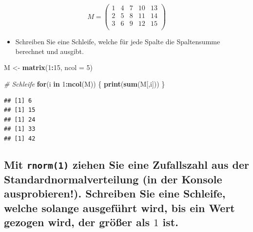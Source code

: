 \documentclass[12pt,a4paper]{article}
\newenvironment{Shaded}{\begin{snugshade}}{\end{snugshade}}
\newcommand{\AttributeTok}[1]{\textcolor[rgb]{0.13,0.29,0.53}{#1}}
\newcommand{\CommentTok}[1]{\textcolor[rgb]{0.56,0.35,0.01}{\textit{#1}}}
\newcommand{\ControlFlowTok}[1]{\textcolor[rgb]{0.13,0.29,0.53}{\textbf{#1}}}
\newcommand{\DecValTok}[1]{\textcolor[rgb]{0.00,0.00,0.81}{#1}}
\newcommand{\FunctionTok}[1]{\textcolor[rgb]{0.13,0.29,0.53}{\textbf{#1}}}
\newcommand{\NormalTok}[1]{#1}
\newcommand{\OtherTok}[1]{\textcolor[rgb]{0.56,0.35,0.01}{#1}}
\newcommand{\SpecialCharTok}[1]{\textcolor[rgb]{0.81,0.36,0.00}{\textbf{#1}}}
\begin{document}
\[
M=\begin{pmatrix}
1 & 4 & 7 & 10 & 13\\
2 & 5 & 8 & 11 & 14\\
3 & 6 & 9 & 12 & 15\\
\end{pmatrix}
\]

\begin{itemize}
  \item Schreiben Sie eine Schleife, welche für jede Spalte die Spaltensumme berechnet und ausgibt.
\end{itemize}

\begin{Shaded}
\begin{Highlighting}[]
\NormalTok{    M }\OtherTok{\textless{}{-}} \FunctionTok{matrix}\NormalTok{(}\DecValTok{1}\SpecialCharTok{:}\DecValTok{15}\NormalTok{, }\AttributeTok{ncol =} \DecValTok{5}\NormalTok{)}
    
    \CommentTok{\# Schleife}
    \ControlFlowTok{for}\NormalTok{(i }\ControlFlowTok{in} \DecValTok{1}\SpecialCharTok{:}\FunctionTok{ncol}\NormalTok{(M)) \{}
      \FunctionTok{print}\NormalTok{(}\FunctionTok{sum}\NormalTok{(M[,i]))}
\NormalTok{    \}}
\end{Highlighting}
\end{Shaded}

\begin{verbatim}
## [1] 6
## [1] 15
## [1] 24
## [1] 33
## [1] 42
\end{verbatim}

\hypertarget{mit-ziehen-sie-eine-zufallszahl-aus-der-standardnormalverteilung-in-der-konsole-ausprobieren.-schreiben-sie-eine-schleife-welche-solange-ausgefuxfchrt-wird-bis-ein-wert-gezogen-wird-der-gruxf6uxdfer-als-1-ist.}{%
\subsection{\texorpdfstring{Mit \texttt{rnorm(1)} ziehen Sie eine
Zufallszahl aus der Standardnormalverteilung (in der Konsole
ausprobieren!). Schreiben Sie eine Schleife, welche solange ausgeführt
wird, bis ein Wert gezogen wird, der größer als \(1\)
ist.}{Mit  ziehen Sie eine Zufallszahl aus der Standardnormalverteilung (in der Konsole ausprobieren!). Schreiben Sie eine Schleife, welche solange ausgeführt wird, bis ein Wert gezogen wird, der größer als 1 ist.}}\label{mit-ziehen-sie-eine-zufallszahl-aus-der-standardnormalverteilung-in-der-konsole-ausprobieren.-schreiben-sie-eine-schleife-welche-solange-ausgefuxfchrt-wird-bis-ein-wert-gezogen-wird-der-gruxf6uxdfer-als-1-ist.}}
\end{document}
